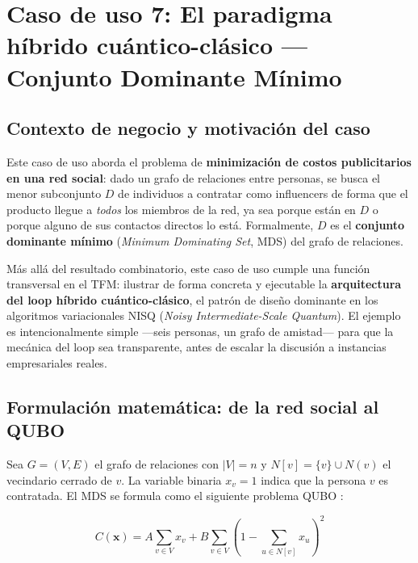 \section{Caso de uso 7: El paradigma híbrido cuántico-clásico — Conjunto Dominante Mínimo}
\label{sec:caso7_hibrido}

\subsection{Contexto de negocio y motivación del caso}

Este caso de uso aborda el problema de \textbf{minimización de costos publicitarios en una red social}: dado un grafo de relaciones entre personas, se busca el menor subconjunto $D$ de individuos a contratar como influencers de forma que el producto llegue a \textit{todos} los miembros de la red, ya sea porque están en $D$ o porque alguno de sus contactos directos lo está. Formalmente, $D$ es el \textbf{conjunto dominante mínimo} (\textit{Minimum Dominating Set}, MDS) del grafo de relaciones.

Más allá del resultado combinatorio, este caso de uso cumple una función transversal en el TFM: ilustrar de forma concreta y ejecutable la \textbf{arquitectura del loop híbrido cuántico-clásico}, el patrón de diseño dominante en los algoritmos variacionales NISQ (\textit{Noisy Intermediate-Scale Quantum}). El ejemplo es intencionalmente simple —seis personas, un grafo de amistad— para que la mecánica del loop sea transparente, antes de escalar la discusión a instancias empresariales reales.

\subsection{Formulación matemática: de la red social al QUBO}

Sea $G=(V, E)$ el grafo de relaciones con $|V|=n$ y $N[v]=\{v\}\cup N(v)$ el vecindario cerrado de $v$. La variable binaria $x_v = 1$ indica que la persona $v$ es contratada. El MDS se formula como el siguiente problema QUBO \citep{lucas2014}:

\begin{equation}
  C(\mathbf{x}) = A\sum_{v \in V} x_v + B\sum_{v \in V}\left(1 - \sum_{u \in N[v]} x_u\right)^2
  \label{eq:mds_qubo}
\end{equation}

